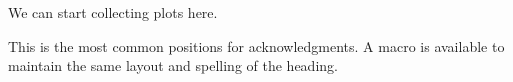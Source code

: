 \documentclass[a4paper,11pt]{article} \pdfoutput=1
\begin{document}
We can start collecting plots here.







\acknowledgments

This is the most common positions for acknowledgments. A macro is
available to maintain the same layout and spelling of the heading.


\appendix













\end{document}
